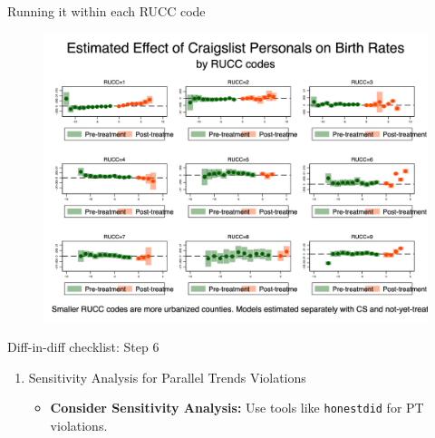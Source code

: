 \documentclass{beamer}
\begin{document}
\begin{frame}{Running it within each RUCC code}

\begin{figure}[ht]
    \centering
    \includegraphics[width=\linewidth, height=0.8\textheight, keepaspectratio]{./lecture_includes/es_br1544_RUCCcombined.png}
\end{figure}

\end{frame}





\begin{frame}{Diff-in-diff checklist: Step 6}
\begin{enumerate}
\item[6. ] Sensitivity Analysis for Parallel Trends Violations
    \begin{itemize}
        \item \textbf{Consider Sensitivity Analysis:} Use tools like \texttt{honestdid} for PT violations.
    \end{itemize}
\end{enumerate}
\end{frame}
\end{document}
